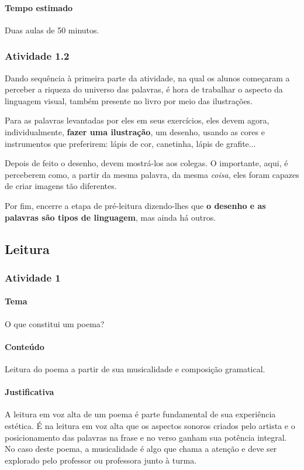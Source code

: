 \documentclass[11pt]{extarticle}
\begin{document}
\paragraph{Tempo estimado} Duas aulas de 50 minutos.



\subsubsection{Atividade 1.2}

Dando sequência à primeira parte da atividade, na qual os alunos
começaram a perceber a riqueza do universo das palavras, 
é hora de trabalhar o aspecto da linguagem visual, também 
presente no livro por meio das ilustrações. 

Para as palavras levantadas por eles em seus exercícios,
eles devem agora, individualmente, \textbf{fazer uma ilustração},
um desenho, usando as cores e instrumentos que preferirem: lápis de cor, 
canetinha, lápis de grafite... 

Depois de feito o desenho, devem mostrá-los aos colegas.
O importante, aqui, é perceberem como, a partir da mesma 
palavra, da mesma \textit{coisa}, eles foram capazes de criar 
imagens tão diferentes. 

Por fim, encerre a etapa de pré-leitura dizendo-lhes
que \textbf{o desenho e as palavras são tipos de linguagem},
mas ainda há outros.


\subsection{Leitura}


\subsubsection{Atividade 1}

\paragraph{Tema} O que constitui um poema?

\paragraph{Conteúdo} Leitura do poema a partir de sua musicalidade e 
composição gramatical.

\paragraph{Justificativa} A leitura em voz alta de um poema é 
parte fundamental de sua experiência estética. 
É na leitura em voz alta que os aspectos sonoros
criados pelo artista e o posicionamento das
palavras na frase e no verso ganham sua potência integral. 
No caso deste poema, a musicalidade é algo que chama a atenção
e deve ser explorado pelo professor ou professora 
junto à turma. 
\end{document}
